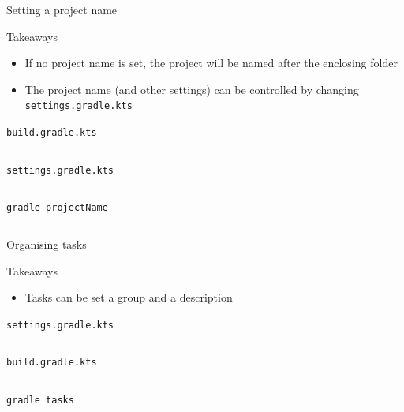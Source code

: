 \documentclass[presentation]{beamer}
\newcommand{\codefile}[4]{
	\begin{block}{\texttt{#2}}
		\inputminted[fontsize=#3,linenos=true,breaklines=true]{#4}{"workspace/#1/#2"}
	\end{block}
}
\newcommand{\groovy}[3]{\codefile{#1}{#2}{#3}{groovy}}
\newcommand{\kotlin}[3]{\codefile{#1}{#2}{#3}{kotlin}}
\newcommand{\terminal}[3]{\codefile{#1}{#2}{#3}{text}}
\newcommand{\tinier}{\fontsize{4pt}{5pt}\selectfont}
\begin{document}
\begin{frame}{Setting a project name}
    \begin{block}{Takeaways}
        \begin{itemize}
            \item If no project name is set, the project will be named after the enclosing folder            \item The project name (and other settings) can be controlled by changing \texttt{settings.gradle.kts}
        \end{itemize}
    \end{block}
    \kotlin{10-ProjectName}{build.gradle.kts}{\scriptsize}
    \kotlin{10-ProjectName}{settings.gradle.kts}{\scriptsize}
    \terminal{10-ProjectName}{gradle projectName}{\scriptsize}
\end{frame}

\begin{frame}{Organising tasks}
    \begin{block}{Takeaways}
        \begin{itemize}
            \item Tasks can be set a group and a description
        \end{itemize}
    \end{block}
    \terminal{11-TaskDescription}{settings.gradle.kts}{\scriptsize}
    \groovy{11-TaskDescription}{build.gradle.kts}{\scriptsize}
    \terminal{11-TaskDescription}{gradle tasks}{\tinier}
\end{frame}
\end{document}
